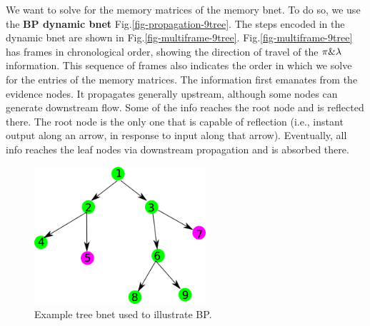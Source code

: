 We want to solve for the 
memory matrices of the 
memory bnet. To do so,
we use the {\bf BP dynamic bnet}
Fig.\ref{fig-propagation-9tree}.
The steps encoded
in the dynamic bnet 
are shown in Fig.\ref{fig-multiframe-9tree}.
Fig.\ref{fig-multiframe-9tree}
has frames in chronological order,
showing the direction of travel
of the $\pi\&\lambda$ information. 
This sequence of frames also indicates 
the order
in which we solve for the entries of
 the memory matrices.
The information first emanates from the evidence nodes.
It propagates generally upstream,
although some nodes
can generate downstream flow. Some of the 
info  reaches the root node and is  reflected there.
The root node is the only one that 
is capable of reflection (i.e., instant output
along an arrow, 
in response to input along that arrow).
Eventually, all info
reaches the leaf nodes 
via downstream propagation and is absorbed there.


\begin{figure}[h!]
\centering
\includegraphics[width=2.5in]
{mpass/mp-9tree.png}
\caption{Example tree bnet
used to illustrate BP.
} 
\label{fig-mp-9tree}
\end{figure}



